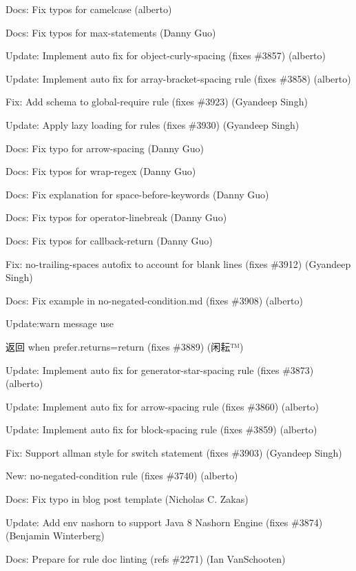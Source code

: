 \begin{DoxyItemize}
\item Docs\+: Fix typos for camelcase (alberto)
\item Docs\+: Fix typos for max-\/statements (Danny Guo)
\item Update\+: Implement auto fix for object-\/curly-\/spacing (fixes \#3857) (alberto)
\item Update\+: Implement auto fix for array-\/bracket-\/spacing rule (fixes \#3858) (alberto)
\item Fix\+: Add schema to {\ttfamily global-\/require} rule (fixes \#3923) (Gyandeep Singh)
\item Update\+: Apply lazy loading for rules (fixes \#3930) (Gyandeep Singh)
\item Docs\+: Fix typo for arrow-\/spacing (Danny Guo)
\item Docs\+: Fix typos for wrap-\/regex (Danny Guo)
\item Docs\+: Fix explanation for space-\/before-\/keywords (Danny Guo)
\item Docs\+: Fix typos for operator-\/linebreak (Danny Guo)
\item Docs\+: Fix typos for callback-\/return (Danny Guo)
\item Fix\+: no-\/trailing-\/spaces autofix to account for blank lines (fixes \#3912) (Gyandeep Singh)
\item Docs\+: Fix example in no-\/negated-\/condition.\+md (fixes \#3908) (alberto)
\item Update\+:warn message use \begin{DoxyReturn}{返回}
when prefer.\+returns=return (fixes \#3889) (闲耘™)
\end{DoxyReturn}

\item Update\+: Implement auto fix for generator-\/star-\/spacing rule (fixes \#3873) (alberto)
\item Update\+: Implement auto fix for arrow-\/spacing rule (fixes \#3860) (alberto)
\item Update\+: Implement auto fix for block-\/spacing rule (fixes \#3859) (alberto)
\item Fix\+: Support allman style for switch statement (fixes \#3903) (Gyandeep Singh)
\item New\+: no-\/negated-\/condition rule (fixes \#3740) (alberto)
\item Docs\+: Fix typo in blog post template (Nicholas C. Zakas)
\item Update\+: Add env \textquotesingle{}nashorn\textquotesingle{} to support Java 8 Nashorn Engine (fixes \#3874) (Benjamin Winterberg)
\item Docs\+: Prepare for rule doc linting (refs \#2271) (Ian Van\+Schooten)
\end{DoxyItemize}

